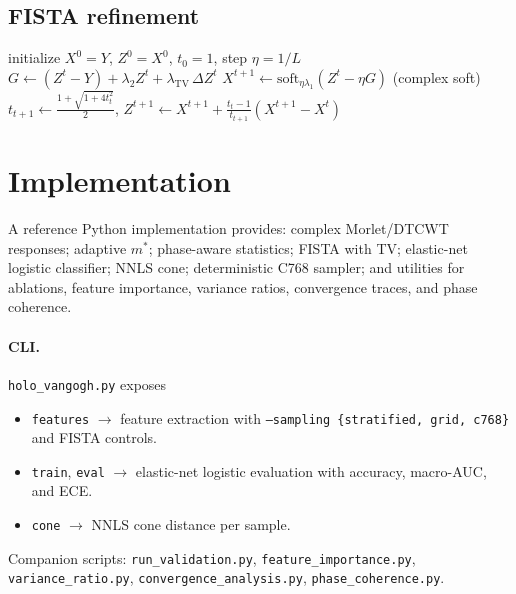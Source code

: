 \documentclass[11pt]{article}
\begin{document}
\subsection{FISTA refinement}
\begin{algorithm}[H]
\caption{Complex FISTA with TV}
\begin{algorithmic}[1]
\State initialize $X^0=Y$, $Z^0=X^0$, $t_0=1$, step $\eta=1/L$
  \State $G\leftarrow (Z^t-Y)+\lambda_2 Z^t+\lambda_{\mathrm{TV}}\,\Delta Z^t$
  \State $X^{t+1}\leftarrow \mathrm{soft}_{\eta\lambda_1}(Z^t-\eta G)$ \hfill (complex soft)
  \State $t_{t+1}\leftarrow \tfrac{1+\sqrt{1+4t_t^2}}{2}$, \; $Z^{t+1}\leftarrow X^{t+1}+\tfrac{t_t-1}{t_{t+1}}(X^{t+1}-X^t)$
\EndFor
\end{algorithmic}
\end{algorithm}

\section{Implementation}
A reference Python implementation provides: complex Morlet/DTCWT responses; adaptive $m^*$; phase-aware statistics; FISTA with TV; elastic-net logistic classifier; NNLS cone; deterministic C768 sampler; and utilities for ablations, feature importance, variance ratios, convergence traces, and phase coherence.

\paragraph{CLI.} \texttt{holo\_vangogh.py} exposes
\begin{itemize}
  \item \texttt{features} \; $\to$ feature extraction with \texttt{--sampling \{stratified, grid, c768\}} and FISTA controls.
  \item \texttt{train}, \texttt{eval} \; $\to$ elastic-net logistic evaluation with accuracy, macro-AUC, and ECE.
  \item \texttt{cone} \; $\to$ NNLS cone distance per sample.
\end{itemize}
Companion scripts: \texttt{run\_validation.py}, \texttt{feature\_importance.py}, \texttt{variance\_ratio.py}, \texttt{convergence\_analysis.py}, \texttt{phase\_coherence.py}.
\end{document}
